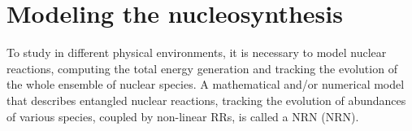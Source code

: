 





\section{Modeling the nucleosynthesis}\label{sec:nucleo:method}

%
To study \nuc{} in different physical environments, it is necessary to 
model nuclear reactions, computing the total energy generation 
\citep[\eg][]{Weaver:1978,Mueller:1986,Timmes:1999} and tracking the 
evolution of the whole ensemble of nuclear species. A mathematical and/or 
numerical model that describes entangled nuclear reactions, tracking the 
evolution of abundances of various species, coupled by non-linear 
\acp{RR}, is called a \acl{NRN} (\acs{NRN}). %

